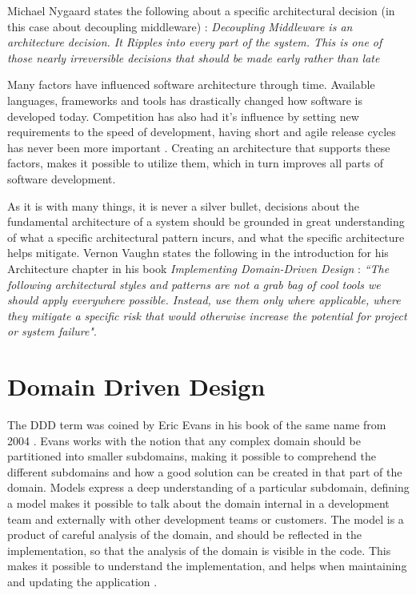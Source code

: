 Michael Nygaard states the following about a specific architectural decision (in this case about decoupling middleware) \cite[p.~116]{nygard2007release}: \textit{Decoupling Middleware is an architecture decision. It Ripples into every part of the system. This is one of those nearly irreversible decisions that should be made early rather than late}

Many factors have influenced software architecture through time. Available languages, frameworks and tools has drastically changed how software is developed today. Competition has also had it's influence by setting new requirements to the speed of development, having short and agile release cycles has never been more important \cite[t.~6:55]{george2016it}. Creating an architecture that supports these factors, makes it possible to utilize them, which in turn improves all parts of software development.

As it is with many things, it is never a silver bullet, decisions about the fundamental architecture of a system should be grounded in great understanding of what a specific architectural pattern incurs, and what the specific architecture helps mitigate. Vernon Vaughn states the following in the introduction for his Architecture chapter in his book \textit{Implementing Domain-Driven Design} \cite[p.~113]{vernon2013implementing}: \textit{“The following architectural styles and patterns are not a grab bag of cool tools we should apply everywhere possible. Instead, use them only where applicable, where they mitigate a specific risk that would otherwise increase the potential for project or system failure"}.

\section{Domain Driven Design}
\label{sec:DDD}
The DDD term was coined by Eric Evans in his book of the same name from 2004 \cite[preface]{evans2004domain}. Evans works with the notion that any complex domain should be partitioned into smaller subdomains, making it possible to comprehend the different subdomains and how a good solution can be created in that part of the domain. Models express a deep understanding of a particular subdomain, defining a model makes it possible to talk about the domain internal in a development team and externally with other development teams or customers. The model is a product of careful analysis of the domain, and should be reflected in the implementation, so that the analysis of the domain is visible in the code. This makes it possible to understand the implementation, and helps when maintaining and updating the application \cite[p.~2]{evans2004domain}.

